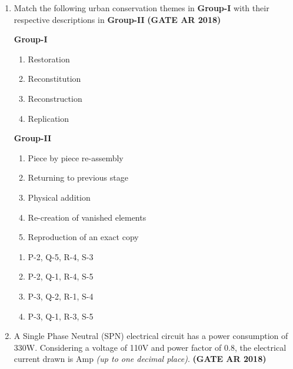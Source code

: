 \documentclass[journal,15pt,onecolumn]{IEEEtran}
\theoremstyle{remark}
\begin{document}
\begin{enumerate}
\begin{multicols}{2}
\begin{enumerate}
\item P-3, Q-4, R-2, S-5
\item P-3, Q-4, R-1, S-2
\item P-2, Q-4, R-1, S-5
\item P-2, Q-5, R-4, S-3
\end{enumerate}
\end{multicols}

\vspace{1cm}


\item 
Match the following urban conservation themes in \textbf{Group-I} with their respective descriptions in \textbf{Group-II}\hfill \textbf{ (GATE AR 2018)}
\begin{multicols}{2}

\textbf{Group-I}
\begin{enumerate}
\item  Restoration
\item  Reconstitution
\item  Reconstruction
\item  Replication
\end{enumerate}

\textbf{Group-II}
\begin{enumerate}
\item Piece by piece re-assembly
\item Returning to previous stage
\item Physical addition
\item Re-creation of vanished elements
\item Reproduction of an exact copy
\end{enumerate}
\end{multicols}

\begin{multicols}{2}
\begin{enumerate}
\item P-2, Q-5, R-4, S-3
\item P-2, Q-1, R-4, S-5
\item P-3, Q-2, R-1, S-4
\item P-3, Q-1, R-3, S-5
\end{enumerate}
\end{multicols}

\vspace{1cm}

\item 
A Single Phase Neutral (SPN) electrical circuit has a power consumption of 330W. Considering a voltage of 110V and power factor of 0.8, the electrical current drawn is \underline{\hspace{3cm}} Amp \emph{(up to one decimal place)}.\hfill \textbf{ (GATE AR 2018)}


\end{enumerate}
\end{document}
